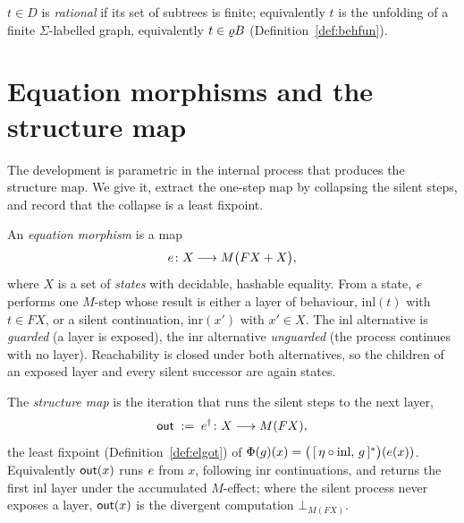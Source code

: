 \begin{definition}\label{def:rational}
  $t \in D$ is \emph{rational} if its set of subtrees is finite; equivalently $t$ is the unfolding of a
  finite $\Sigma$-labelled graph, equivalently $t \in \varrho B$ (Definition~\ref{def:behfun}).
\end{definition}

\section{Equation morphisms and the structure map}\label{sec:itcoalg}
The development is parametric in the internal process that produces the structure map. We give it,
extract the one-step map by collapsing the silent steps, and record that the collapse is a least
fixpoint.

\begin{definition}\label{def:itcoalg}
  An \emph{equation morphism} is a map
  \[
    e \colon X \longrightarrow M\big(F X + X\big),
  \]
  where $X$ is a set of \emph{states} with decidable, hashable equality. From a state, $e$
  performs one $M$-step whose result is either a layer of behaviour, $\mathrm{inl}(t)$ with $t \in F X$,
  or a silent continuation, $\mathrm{inr}(x')$ with $x' \in X$. The $\mathrm{inl}$ alternative is
  \emph{guarded} (a layer is exposed), the $\mathrm{inr}$ alternative \emph{unguarded} (the process
  continues with no layer). Reachability is closed under both alternatives, so the children of an
  exposed layer and every silent successor are again states.
\end{definition}

\begin{definition}\label{def:out}
  The \emph{structure map} is the iteration that runs the silent steps to the next layer,
  \[
    \mathsf{out} \;:=\; e^{\dagger} \colon X \longrightarrow M(F X),
  \]
  the least fixpoint (Definition~\ref{def:elgot}) of
  $\Phi(g)(x) = \big(\,[\,\eta\circ\mathrm{inl},\,g\,]^{*}\big)(e(x))$. Equivalently $\mathsf{out}(x)$ runs
  $e$ from $x$, following $\mathrm{inr}$ continuations, and returns the first $\mathrm{inl}$ layer
  under the accumulated $M$-effect; where the silent process never exposes a layer, $\mathsf{out}(x)$ is the
  divergent computation $\bot_{M(FX)}$.
\end{definition}

